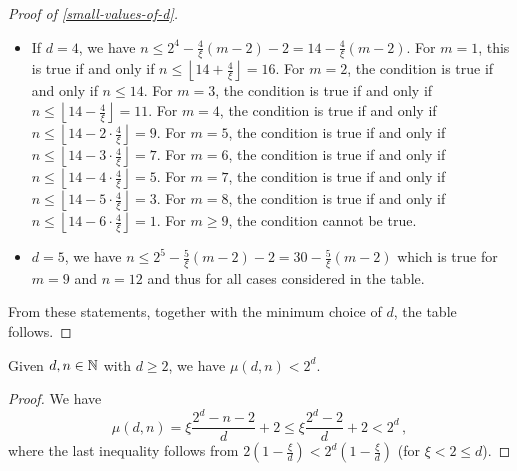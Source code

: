 \begin{proof}[Proof of \cref{small-values-of-d}]
\begin{itemize}
     For $m=2$, the condition is true if and only if $n \leq 6$.
     For $m=3$, the condition is true if and only if $n \leq \left \lfloor 6 - \frac{3}{\xi} \right\rfloor = 4$.
     For $m=4$, the condition is true if and only if $n \leq \left \lfloor 6 - 2 \cdot \frac{3}{\xi} \right\rfloor = 2$.
     For $m=5$, the condition is true if and only if $n \leq \left \lfloor 6 - 3 \cdot \frac{3}{\xi} \right\rfloor = 1$.
     For $m \geq 6$, the condition cannot be true.
   \item If $d = 4$, we have  $n \leq 2^4 - \frac{4}{\xi}(m-2) - 2 = 14 - \frac{4}{\xi}(m-2)$.
     For $m=1$, this is true if and only if $n \leq \left \lfloor 14 + \frac{4}{\xi} \right\rfloor = 16$.
     For $m=2$, the condition is true if and only if  $n \leq 14$.
     For $m=3$, the condition is true if and only if $n \leq \left \lfloor 14 - \frac{4}{\xi} \right\rfloor = 11$.
     For $m=4$, the condition is true if and only if $n \leq \left \lfloor 14 - 2\cdot\frac{4}{\xi} \right\rfloor = 9$.
     For $m=5$, the condition is true if and only if $n \leq \left \lfloor 14 - 3\cdot\frac{4}{\xi} \right\rfloor = 7$.
     For $m=6$, the condition is true if and only if $n \leq \left \lfloor 14 - 4\cdot\frac{4}{\xi} \right\rfloor = 5$.
     For $m=7$, the condition is true if and only if $n \leq \left \lfloor 14 - 5\cdot\frac{4}{\xi} \right\rfloor = 3$.
     For $m=8$, the condition is true if and only if $n \leq \left \lfloor 14 - 6\cdot\frac{4}{\xi} \right\rfloor = 1$.
     For $m \geq 9$, the condition cannot be true.
   \item $d = 5$, we have  $n \leq 2^5 - \frac{5}{\xi}(m-2) - 2 = 30 - \frac{5}{\xi}(m-2)$ which is true for
     $m = 9$ and $n = 12$ and thus for all cases considered in the table.
\end{itemize}
From these statements, together with the minimum choice of $d$, the table follows.
\end{proof}

\begin{lemma}\label{upper bound mu}
Given $d, n \in \mathbb N$ with $d \geq 2$, we have
$
\mu(d, n) < 2^d
$.
\begin{proof}
We have 
\[\mu(d, n) = \xi \frac{2^d - n - 2}{d} + 2 \leq \xi \frac{2^d - 2}{d} + 2
            < 2^d\,,\]
where the last inequality follows from 
$2\left(1 - \frac{\xi}{d} \right) < 2^d\left(1 - \frac{\xi}{d} \right)$
(for $\xi < 2 \leq d$).
\end{proof}
\end{lemma}

